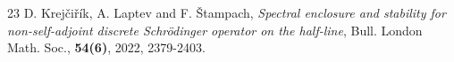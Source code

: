 \documentclass[12pt]{amsart}
\theoremstyle{definition}
\theoremstyle{plain}
\theoremstyle{definition}
\numberwithin{equation}{section}
\begin{document}
\begin{thebibliography}{23}
         {\sc D. Krej\v{c}i\v{r}\'{i}k, A. Laptev and F. \v{S}tampach},
         {\it Spectral enclosure and stability for non-self-adjoint discrete Schr\"{o}dinger operator on the half-line},
         {Bull. London Math. Soc.}, {\bf 54(6)}, 2022, 2379-2403.


%

\end{thebibliography}
\end{document}
